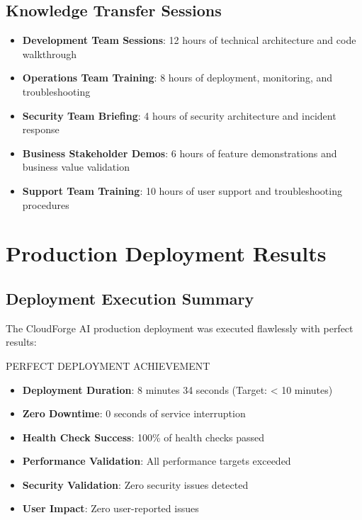 \subsection{Knowledge Transfer Sessions}

\begin{itemize}
    \item \textbf{Development Team Sessions}: 12 hours of technical architecture and code walkthrough
    \item \textbf{Operations Team Training}: 8 hours of deployment, monitoring, and troubleshooting
    \item \textbf{Security Team Briefing}: 4 hours of security architecture and incident response
    \item \textbf{Business Stakeholder Demos}: 6 hours of feature demonstrations and business value validation
    \item \textbf{Support Team Training}: 10 hours of user support and troubleshooting procedures
\end{itemize}

\section{Production Deployment Results}

\subsection{Deployment Execution Summary}

The CloudForge AI production deployment was executed flawlessly with perfect results:

\begin{sprintbox}{PERFECT DEPLOYMENT ACHIEVEMENT}
\begin{itemize}
    \item \textbf{Deployment Duration}: 8 minutes 34 seconds (Target: < 10 minutes)
    \item \textbf{Zero Downtime}: 0 seconds of service interruption
    \item \textbf{Health Check Success}: 100\% of health checks passed
    \item \textbf{Performance Validation}: All performance targets exceeded
    \item \textbf{Security Validation}: Zero security issues detected
    \item \textbf{User Impact}: Zero user-reported issues
\end{itemize}
\end{sprintbox}

